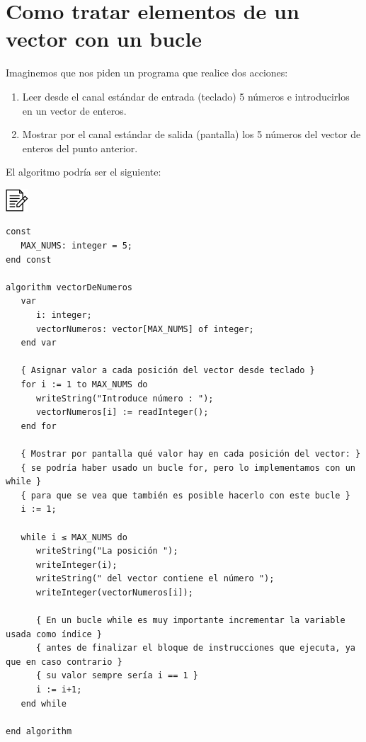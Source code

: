 \documentclass[
]{book}
\providecommand{\tightlist}{%
  \setlength{\itemsep}{0pt}\setlength{\parskip}{0pt}}
\begin{document}
\hypertarget{como-tratar-elementos-de-un-vector-con-un-bucle}{%
\section{Como tratar elementos de un vector con un bucle}\label{como-tratar-elementos-de-un-vector-con-un-bucle}}

Imaginemos que nos piden un programa que realice dos acciones:

\begin{enumerate}
\def\labelenumi{\arabic{enumi}.}
\tightlist
\item
  Leer desde el canal estándar de entrada (teclado) 5 números e introducirlos en un vector de enteros.
\item
  Mostrar por el canal estándar de salida (pantalla) los 5 números del vector de enteros del punto anterior.
\end{enumerate}

El algoritmo podría ser el siguiente:

\includegraphics{./img/alg.png}

\begin{verbatim}
const
   MAX_NUMS: integer = 5;
end const

algorithm vectorDeNumeros
   var
      i: integer;
      vectorNumeros: vector[MAX_NUMS] of integer;
   end var

   { Asignar valor a cada posición del vector desde teclado }
   for i := 1 to MAX_NUMS do
      writeString("Introduce número : ");
      vectorNumeros[i] := readInteger();
   end for

   { Mostrar por pantalla qué valor hay en cada posición del vector: }
   { se podría haber usado un bucle for, pero lo implementamos con un while }
   { para que se vea que también es posible hacerlo con este bucle }
   i := 1;

   while i ≤ MAX_NUMS do
      writeString("La posición ");
      writeInteger(i);
      writeString(" del vector contiene el número ");
      writeInteger(vectorNumeros[i]);

      { En un bucle while es muy importante incrementar la variable usada como índice }
      { antes de finalizar el bloque de instrucciones que ejecuta, ya que en caso contrario }
      { su valor sempre sería i == 1 }
      i := i+1;
   end while

end algorithm
\end{verbatim}
\end{document}
